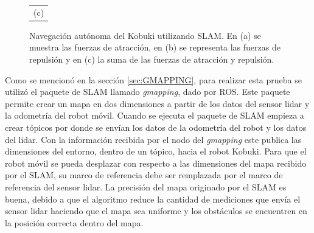 \begin{figure}
\begin{tabular}{c}
      \multicolumn{1}{c}{(c)}
    \end{tabular}
  \captionsetup{font=footnotesize}
    \caption{\label{fig:Kbki_slam}Navegación autónoma del Kobuki utilizando
    SLAM. En (a) se muestra las fuerzas de atracción, en (b) se representa 
    las fuerzas de repulsión y en (c) la suma de las fuerzas de atracción y 
    repulsión.}
\end{figure}


Como se mencionó en la sección \ref{sec:GMAPPING}, para realizar esta prueba se utilizó
el paquete de SLAM llamado \textit{gmapping}, dado por ROS. Este paquete permite crear 
un mapa en dos dimensiones a partir de los datos del sensor lidar y la odometría del 
robot móvil. Cuando se ejecuta el paquete de SLAM empieza a crear tópicos por donde se
envían los datos de la odometría del robot y los datos del lidar. Con la información 
recibida por el nodo del \textit{gmapping} este publica las dimensiones del entorno, dentro
de un tópico, hacia el robot Kobuki. Para que el robot móvil se pueda desplazar con respecto
a las dimensiones del mapa recibido por el SLAM, su marco de referencia debe ser remplazada
por el marco de referencia del sensor lidar. La precisión del mapa originado por el SLAM es 
buena, debido a que el algoritmo reduce la cantidad de mediciones que envía el sensor lidar
haciendo que el mapa sea uniforme y los obstáculos se encuentren en la posición correcta
dentro del mapa.

